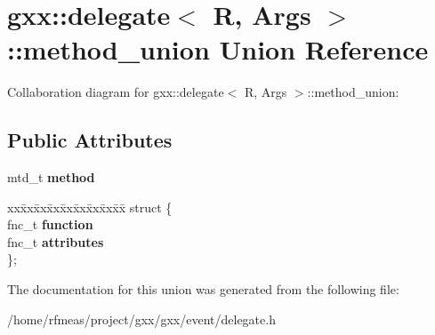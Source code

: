 \hypertarget{uniongxx_1_1delegate_1_1method__union}{}\section{gxx\+:\+:delegate$<$ R, Args $>$\+:\+:method\+\_\+union Union Reference}
\label{uniongxx_1_1delegate_1_1method__union}


Collaboration diagram for gxx\+:\+:delegate$<$ R, Args $>$\+:\+:method\+\_\+union\+:
\subsection*{Public Attributes}
\begin{DoxyCompactItemize}
\item 
mtd\+\_\+t {\bfseries method}\hypertarget{uniongxx_1_1delegate_1_1method__union_a20ac73a8e981baf977b970f5102ff594}{}\label{uniongxx_1_1delegate_1_1method__union_a20ac73a8e981baf977b970f5102ff594}

\item 
\begin{tabbing}
xx\=xx\=xx\=xx\=xx\=xx\=xx\=xx\=xx\=\kill
struct \{\\
\>fnc\_t {\bfseries function}\\
\>fnc\_t {\bfseries attributes}\\
\}; \hypertarget{uniongxx_1_1delegate_1_1method__union_a9a52abfba2d066865ce55ba942a67341}{}\label{uniongxx_1_1delegate_1_1method__union_a9a52abfba2d066865ce55ba942a67341}
\\

\end{tabbing}\end{DoxyCompactItemize}


The documentation for this union was generated from the following file\+:\begin{DoxyCompactItemize}
\item 
/home/rfmeas/project/gxx/gxx/event/delegate.\+h\end{DoxyCompactItemize}
